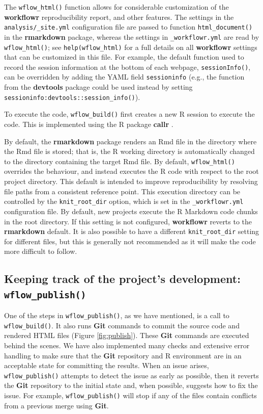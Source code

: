 \documentclass[9pt,a4paper]{extarticle}
\begin{document}
The \texttt{wflow\_html()} function allows for considerable customization of the
 \textbf{workflowr} reproducibility report, and other features. The settings in
the \texttt{analysis/\_site.yml} configuration file are passed to
function \texttt{html\_document()} in the \textbf{rmarkdown} package, whereas the settings
in \texttt{\_workflowr.yml} are read by \texttt{wflow\_html()}; see
\texttt{help(wflow\_html)} for a full details on all \textbf{workflowr} settings
that can be customized in this file. For example, the default function
used to record the session information at the bottom of each webpage,
\texttt{sessionInfo()}, can be overridden by adding the YAML field
\texttt{sessioninfo} (e.g., the function from the \textbf{devtools}
\cite{devtools} package could be used instead by setting
\texttt{sessioninfo:\;devtools::session\_info()}).

To execute the code, \texttt{wflow\_build()} first creates a new R session to
execute the code. This is implemented using the R package \textbf{callr}
\cite{callr}.

By default, the \textbf{rmarkdown} package renders an Rmd file in the directory
where the Rmd file is stored; that is, the R working directory is
automatically changed to the directory containing the target Rmd file.
By default, \texttt{wflow\_html()} overrides the behaviour, and instead executes
the R code with respect to the root project directory. This default is
intended to improve reproducibility by resolving file paths from a
consistent reference point. This execution directory can be controlled
by the \texttt{knit\_root\_dir} option, which is set in the 
\texttt{\_workflowr.yml} configuration file. By default, new projects execute the
R Markdown code chunks in the root directory. If this setting is not
configured, \textbf{workflowr} reverts to the \textbf{rmarkdown} default. It is also
possible to have a different \texttt{knit\_root\_dir} setting for
different files, but this is generally not recommended as it will make
the code more difficult to follow.

\subsection*{Keeping track of the project's development: \texttt{wflow\_publish()}}

One of the steps in \texttt{wflow\_publish()}, as we have mentioned, is a call to
\texttt{wflow\_build()}. It also runs \textbf{Git} commands to commit the source code and
rendered HTML files (Figure \ref{fig:publish}). These \textbf{Git} commands are executed behind
the scenes. We have also implemented many checks and extensive error
handling to make sure that the \textbf{Git} repository and R environment are in
an acceptable state for committing the results. When an issue arises,
\texttt{wflow\_publish()} attempts to detect the issue as early as possible, then
it reverts the \textbf{Git} repository to the initial state and, when possible,
suggests how to fix the issue. For example, \texttt{wflow\_publish()} will stop if
any of the files contain conflicts from a previous merge using \textbf{Git}.
\end{document}
